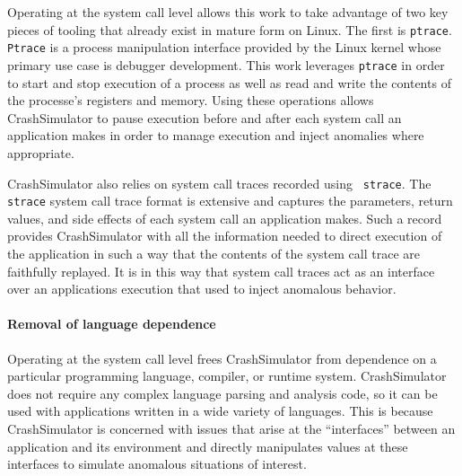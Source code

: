         Operating at the system call level allows this work to take advantage of
        two key pieces of tooling that already exist in mature form on Linux.
        The first is {\tt ptrace}. {\tt Ptrace} is a process manipulation interface provided
        by the Linux kernel whose primary use case is debugger development.
        This work leverages {\tt ptrace} in order to start and stop execution of a
        process as well as read and write the contents of the processe's
        registers and memory.  Using these operations allows CrashSimulator to
        pause execution before and after each system call an application makes
        in order to manage execution and inject anomalies where appropriate.

        CrashSimulator also relies on system call traces recorded using {\tt
          strace}.  The {\tt strace} system call trace format is extensive and
        captures the parameters, return values, and side effects of each system
        call an application makes.  Such a record provides CrashSimulator with
        all the information needed to direct execution of the application in
        such a way that the contents of the system call trace are faithfully
        replayed.  It is in this way that system call traces act as an interface
        over an applications execution that used to inject anomalous behavior.

        \paragraph{Removal of language dependence}

        Operating at the system call level frees CrashSimulator from
        dependence on a particular programming language, compiler, or runtime system.  
	CrashSimulator does not require any complex language parsing and
        analysis code, %
	so it can be used with applications written in a wide variety of languages.
	This is because CrashSimulator is concerned with issues that arise
        at the ``interfaces'' between an application and its environment
	and directly manipulates values at these interfaces to simulate
	anomalous situations of interest.

